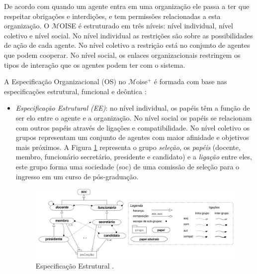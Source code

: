 De acordo com \cite{hannoun2000moise} quando um agente entra em uma organização ele passa a ter que respeitar obrigações e interdições, e tem permissões relacionadas a esta organização. O $\mathcal{M}$OISE é estruturado em três níveis: nível individual, nível coletivo e nível social. No nível individual as restrições são sobre as possibilidades de ação de cada agente. No nível coletivo a restrição está no conjunto de agentes que podem cooperar. No nível social, os enlaces organizacionais restringem os tipos de interação que os agentes podem ter com o sistema.

A Especificação Organizacional (OS) no $\mathcal{M}$oise$^{+}$ é formada com base nas especificações estrutural, funcional e deôntica \cite{hubner2003modelo}:

\begin{itemize}

\item {\it Especificação Estrutural (EE)}: no nível individual, os papéis têm a função de ser elo entre o agente e a organização. No nível social os papéis se relacionam com outros papéis através de ligações e compatibilidade. No nível coletivo os grupos representam um conjunto de agentes com maior afinidade e objetivos mais próximos. A Figura \ref{fig:ee_exemplo} representa o grupo \textit{seleção}, os \textit{papéis} (docente, membro, funcionário secretário, presidente e candidato) e a \textit{ligação} entre eles, este grupo forma uma sociedade (soc) de uma comissão de seleção para o ingresso em um curso de pós-graduação.

\begin{figure}[ht]
\centering
\includegraphics[scale=0.35]{imagens/modelo3.png}
\caption{Especificação Estrutural \cite{hubner2003modelo}.}
\label{fig:ee_exemplo}
\end{figure}



\end{itemize}
